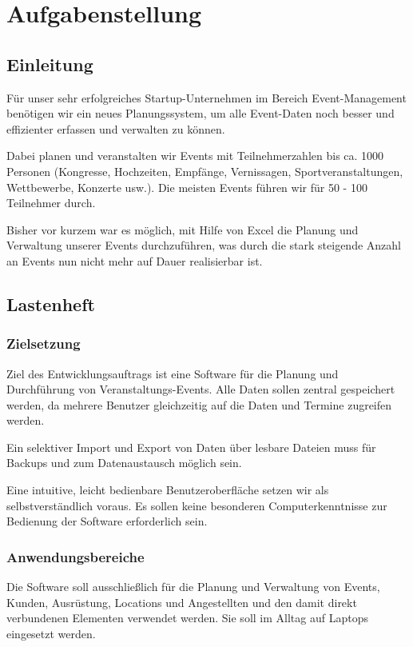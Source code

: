 \chapter{Aufgabenstellung}
\section{Einleitung}
Für unser sehr erfolgreiches Startup-Unternehmen im Bereich Event-Management benötigen wir ein neues Planungssystem, um alle Event-Daten noch besser und effizienter erfassen und verwalten zu können.

Dabei planen und veranstalten wir Events mit Teilnehmerzahlen bis ca. 1000 Personen (Kongresse, Hochzeiten, Empfänge, Vernissagen, Sportveranstaltungen, Wettbewerbe, Konzerte usw.). Die meisten Events führen wir für 50 - 100 Teilnehmer durch.

Bisher vor kurzem war es möglich, mit Hilfe von Excel die Planung und Verwaltung unserer Events durchzuführen, was durch die stark steigende Anzahl an Events nun nicht mehr auf Dauer realisierbar ist.

\section{Lastenheft}
\subsection{Zielsetzung}
Ziel des Entwicklungsauftrags ist eine Software für die Planung und Durchführung von Veranstaltungs-Events. Alle Daten sollen zentral gespeichert werden, da mehrere Benutzer gleichzeitig auf die Daten und Termine zugreifen werden.

Ein selektiver Import und Export von Daten über lesbare Dateien muss für Backups und zum Datenaustausch möglich sein.

Eine intuitive, leicht bedienbare Benutzeroberfläche setzen wir als selbstverständlich voraus. Es sollen keine besonderen Computerkenntnisse zur Bedienung der Software erforderlich sein. 
\subsection{Anwendungsbereiche}
Die Software soll ausschließlich für die Planung und Verwaltung von Events, Kunden, Ausrüstung, Locations und Angestellten und den damit direkt verbundenen Elementen verwendet werden. Sie soll im Alltag auf Laptops eingesetzt werden.
